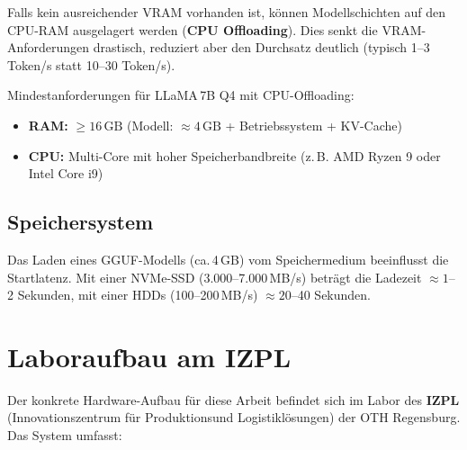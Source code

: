 Falls kein ausreichender VRAM vorhanden ist, können Modellschichten
auf den CPU-RAM ausgelagert werden (\textbf{CPU Offloading}). Dies
senkt die VRAM-Anforderungen drastisch, reduziert aber den Durchsatz
deutlich (typisch 1--3 Token/s statt 10--30 Token/s).

Mindestanforderungen für LLaMA\,7B Q4 mit CPU-Offloading:
\begin{itemize}
    \item \textbf{RAM:} $\geq 16\,\text{GB}$ (Modell: $\approx 4\,\text{GB}$
          + Betriebssystem + KV-Cache)
    \item \textbf{CPU:} Multi-Core mit hoher Speicherbandbreite
          (z.\,B. AMD Ryzen 9 oder Intel Core i9)
\end{itemize}

\subsection{Speichersystem}

Das Laden eines GGUF-Modells (ca.\,4\,GB) vom Speichermedium
beeinflusst die Startlatenz. Mit einer NVMe-SSD (3.000--7.000\,MB/s)
beträgt die Ladezeit $\approx 1$--2 Sekunden, mit einer HDDs
(100--200\,MB/s) $\approx 20$--40 Sekunden.

\section{Laboraufbau am IZPL}
\label{sec:izpl}

Der konkrete Hardware-Aufbau für diese Arbeit befindet sich im Labor des
\textbf{IZPL} (Innovationszentrum für Produktions\-und Logistiklösungen)
der OTH Regensburg. Das System umfasst:

